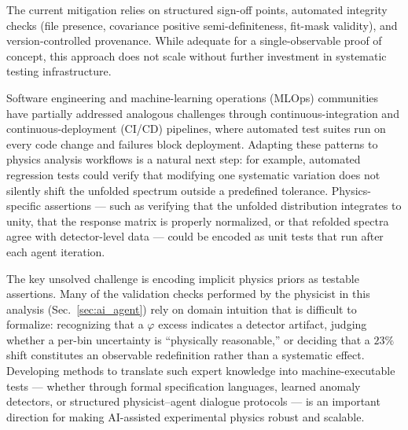 The current mitigation relies on structured sign-off points, automated integrity checks (file presence, covariance positive semi-definiteness, fit-mask validity), and version-controlled provenance. While adequate for a single-observable proof of concept, this approach does not scale without further investment in systematic testing infrastructure.

Software engineering and machine-learning operations (MLOps) communities have partially addressed analogous challenges through continuous-integration and continuous-deployment (CI/CD) pipelines, where automated test suites run on every code change and failures block deployment. Adapting these patterns to physics analysis workflows is a natural next step: for example, automated regression tests could verify that modifying one systematic variation does not silently shift the unfolded spectrum outside a predefined tolerance. Physics-specific assertions --- such as verifying that the unfolded distribution integrates to unity, that the response matrix is properly normalized, or that refolded spectra agree with detector-level data --- could be encoded as unit tests that run after each agent iteration.

The key unsolved challenge is encoding implicit physics priors as testable assertions. Many of the validation checks performed by the physicist in this analysis (Sec.~\ref{sec:ai_agent}) rely on domain intuition that is difficult to formalize: recognizing that a $\varphi$ excess indicates a detector artifact, judging whether a per-bin uncertainty is ``physically reasonable,'' or deciding that a $23\%$ shift constitutes an observable redefinition rather than a systematic effect. Developing methods to translate such expert knowledge into machine-executable tests --- whether through formal specification languages, learned anomaly detectors, or structured physicist--agent dialogue protocols --- is an important direction for making AI-assisted experimental physics robust and scalable.

